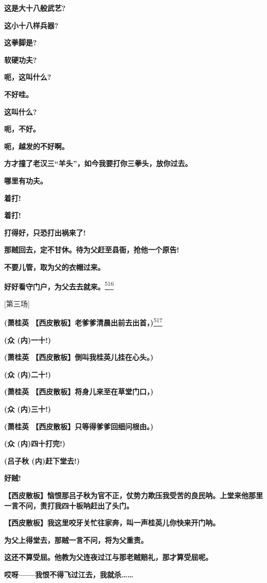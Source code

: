 \textbf{这是大十八般武艺?}

\textbf{这小十八样兵器?}

\textbf{这拳脚是?}

\textbf{软硬功夫?}

\textbf{呃，这叫什么?}

\textbf{不好哇。}

\textbf{这叫什么?}

\textbf{呃，不好。}

\textbf{呃，越发的不好啊。}

\textbf{方才撞了老汉三``羊头''，如今我要打你三拳头，放你过去。}

\textbf{哪里有功夫。}

\textbf{着打!}

\textbf{着打!}

\textbf{打得好，只恐打出祸来了!}

\textbf{那贼回去，定不甘休。待为父赶至县衙，抢他一个原告!}

\textbf{不要儿管，取为父的衣帽过来。}

\textbf{好好看守门户，为父去去就来。}\protect\hyperlink{fn516}{\textsuperscript{516}}

{[}第三场{]}

\textbf{(萧桂英
【西皮散板】老爹爹清晨出前去出首，)}\protect\hyperlink{fn517}{\textsuperscript{517}}

\textbf{(众 (内)一十!)}

\textbf{(萧桂英 【西皮散板】倒叫我桂英儿挂在心头。)}

\textbf{(众 (内)二十!)}

\textbf{(萧桂英 【西皮散板】将身儿来至在草堂门口，)}

\textbf{(众 (内)三十!)}

\textbf{(萧桂英 【西皮散板】只等得爹爹回细问根由。)}

\textbf{(众 (内)四十打完!)}

\textbf{(吕子秋 (内)赶下堂去!)}

\textbf{好贼!}

\textbf{【西皮散板】恼恨那吕子秋为官不正，仗势力欺压我受苦的良民呐。上堂来他那里一言不问，责打我四十板呐赶出了头门。}

\textbf{【西皮散板】我这里咬牙关忙往家奔，叫一声桂英儿你快来开门呐。}

\textbf{为父上得堂去，那贼一言不问，将为父重责。}

\textbf{这还不算受屈。他教为父连夜过江与那老贼赔礼，那才算受屈呢。}

\textbf{哎呀------我恨不得飞过江去，我就杀\ldots{}\ldots{}}

